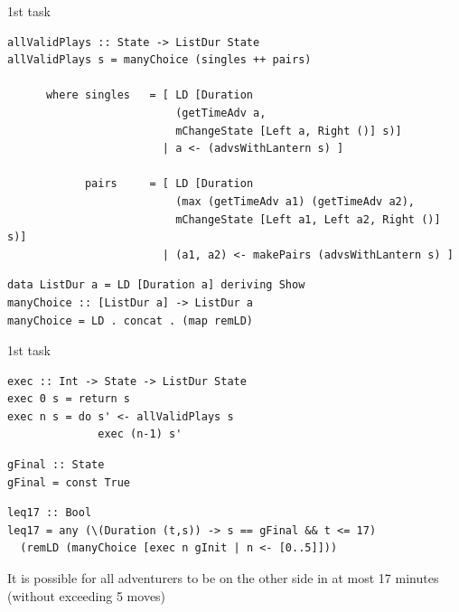 \documentclass[aspectratio=169]{beamer}
\begin{document}
\begin{frame}[fragile]{1st task}

\begin{verbatim}
allValidPlays :: State -> ListDur State
allValidPlays s = manyChoice (singles ++ pairs)

      where singles   = [ LD [Duration 
                          (getTimeAdv a,
                          mChangeState [Left a, Right ()] s)]
                        | a <- (advsWithLantern s) ]

            pairs     = [ LD [Duration 
                          (max (getTimeAdv a1) (getTimeAdv a2),
                          mChangeState [Left a1, Left a2, Right ()] s)]
                        | (a1, a2) <- makePairs (advsWithLantern s) ]
\end{verbatim}

\begin{verbatim}
data ListDur a = LD [Duration a] deriving Show
manyChoice :: [ListDur a] -> ListDur a
manyChoice = LD . concat . (map remLD)
\end{verbatim}

\end{frame}

\begin{frame}[fragile]{1st task}

\begin{verbatim}
exec :: Int -> State -> ListDur State
exec 0 s = return s
exec n s = do s' <- allValidPlays s
              exec (n-1) s'
\end{verbatim}

\begin{verbatim}
gFinal :: State
gFinal = const True
\end{verbatim}

\begin{verbatim}
leq17 :: Bool
leq17 = any (\(Duration (t,s)) -> s == gFinal && t <= 17)
  (remLD (manyChoice [exec n gInit | n <- [0..5]]))
\end{verbatim}

It is possible for all adventurers to be on the other side in at most
17 minutes (without exceeding 5 moves) \checkmark
\end{frame}
\end{document}
